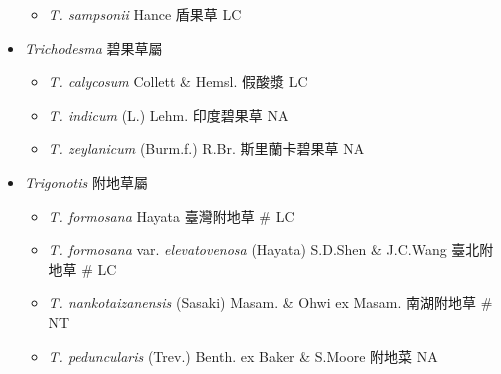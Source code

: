 \begin{itemize}
  \begin{itemize}
        \item[] \textit{T. sampsonii} Hance  盾果草   LC
  \end{itemize}
 \item[] \textit{Trichodesma} 碧果草屬
                                
  \begin{itemize}
        \item[] \textit{T. calycosum} Collett \& Hemsl.  假酸漿   LC
        \item[] \textit{T. indicum} (L.) Lehm.  印度碧果草   NA
        \item[] \textit{T. zeylanicum} (Burm.f.) R.Br.  斯里蘭卡碧果草   NA
  \end{itemize}
 \item[] \textit{Trigonotis} 附地草屬
                                
  \begin{itemize}
        \item[] \textit{T. formosana} Hayata  臺灣附地草  \# LC
        \item[] \textit{T. formosana} var. \textit{elevatovenosa} (Hayata) S.D.Shen \& J.C.Wang  臺北附地草  \# LC
        \item[] \textit{T. nankotaizanensis} (Sasaki) Masam. \& Ohwi ex Masam.  南湖附地草  \# NT
        \item[] \textit{T. peduncularis} (Trev.) Benth. ex Baker \& S.Moore  附地菜   NA
  \end{itemize}
  \end{itemize}
